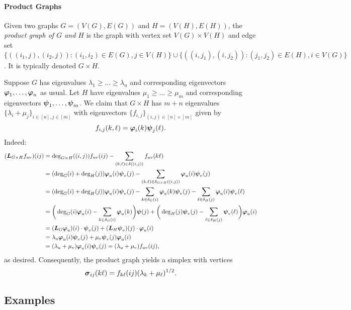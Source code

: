 \paragraph{Product Graphs}

\begin{definition}
	\label{def:product_graphs}
	Given two graphs $G=(V(G),E(G))$ and $H=(V(H), E(H))$, the \emph{product graph of $G$ and $H$} is the graph with vertex set $V(G)\times V(H)$ and edge set
	$\{((i_1,j),(i_2,j)):(i_1,i_2)\in E(G), j\in V(H)\}\cup\{((i,j_1),(i,j_2)):(j_1,j_2)\in E(H), i\in V(G)\}$. It is typically denoted $G\times H$. 
\end{definition} 

Suppose $G$ has eigenvalues $\lambda_1\geq \dots\geq \lambda_{n}$ and corresponding eigenvectors $\vb*{\varphi}_1,\dots,\vb*{\varphi}_{n}$ as usual. Let $H$ have eigenvalues $\mu_1\geq \dots\geq \mu_{m}$ and corresponding eigenvectors $\vb*{\psi}_1,\dots,\vb*{\psi}_{m}$. 
We claim that $G\times H$ has $m+n$ eigenvalues $\{\lambda_i+\mu_j\}_{i\in[n],j\in[m]}$ with eigenvectors $\{f_{i,j}\}_{(i,j)\in[n]\times[m]}$ given by 
\[f_{i,j}(k,\ell) = \vb*{\varphi}_i(k)\vb*{\psi}_j(\ell).\]
Indeed: 
\begin{align*}
(\vb*{L}_{G\times H} f_{uv})(ij) &= \deg_{G\times H}((i,j))f_{uv}(ij) - \sum_{(k,\ell)\in \delta((i,j))} f_{uv}(k\ell) \\
&= (\deg_G(i)+\deg_H(j))\vb*{\varphi}_u(i)\vb*{\psi}_v(j) - \sum_{(k,\ell)\in \delta_{G\times H}((i,j))} \vb*{\varphi}_u(i)\vb*{\psi}_v(j) \\
&= (\deg_G(i)+\deg_H(j))\vb*{\varphi}_u(i)\vb*{\psi}_v(j) - \sum_{k\in \delta_G(i)} \vb*{\varphi}_u(k)\vb*{\psi}_v(j) - \sum_{\ell\in \delta_H(j)} \vb*{\varphi}_u(i)\vb*{\psi}_v(\ell) \\
&=\bigg(\deg_G(i)\vb*{\varphi}_u(i) - \sum_{k\in\delta_G(i)}\vb*{\varphi}_u(k)\bigg)\vb*{\psi}(j) + \bigg(\deg_H(j)\vb*{\psi}_v(j)-\sum_{\ell\in\delta_H(j)}\vb*{\psi}_v(\ell)\bigg)\vb*{\varphi}_u(i) \\
&= (\vb*{L}_G \vb*{\varphi}_u)(i) \cdot \vb*{\psi}_v(j) + (\vb*{L}_H\vb*{\psi}_v)(j)\cdot \vb*{\varphi}_u(i) \\
&= \lambda_u\vb*{\varphi}_u(i) \vb*{\psi}_v(j) + \mu_v\vb*{\psi}_v(j)\vb*{\varphi}_u(i) \\
&= (\lambda_u+\mu_v)\vb*{\varphi}_u(i)\vb*{\psi}_v(j) = (\lambda_u+\mu_v)f_{uv}(ij),
\end{align*}
as desired. Consequently, the product graph yields a simplex with vertices 
\[\vb*{\sigma}_{ij}(k\ell)=f_{k\ell}(ij)(\lambda_k+\mu_\ell)^{1/2}.\]


\subsection{Examples}

